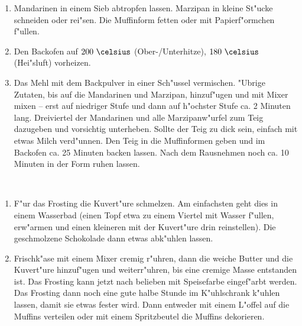 
\begin{enumerate}
 \item Mandarinen in einem Sieb abtropfen lassen. Marzipan in kleine St"ucke schneiden oder rei"sen. Die Muffinform fetten oder mit Papierf"ormchen f"ullen.
 \item Den Backofen auf $200~\celsius$ (Ober-/Unterhitze), $180~\celsius$ (Hei"sluft) vorheizen.
 \item Das Mehl mit dem Backpulver in einer Sch"ussel vermischen. "Ubrige Zutaten, bis auf die Mandarinen und Marzipan, hinzuf"ugen und mit Mixer mixen – erst auf niedriger Stufe und dann auf h"ochster Stufe ca. 2 Minuten lang. Dreiviertel der Mandarinen und alle Marzipanw"urfel zum Teig dazugeben und vorsichtig unterheben. Sollte der Teig zu dick sein, einfach mit etwas Milch verd"unnen. Den Teig in die Muffinformen geben und im Backofen ca. 25 Minuten backen lassen. Nach dem Rausnehmen noch ca. 10 Minuten in der Form ruhen lassen.

\end{enumerate}
\hspace{0em}\\
\begin{enumerate}
 \item F"ur das Frosting die Kuvert"ure schmelzen.
 Am einfachsten geht dies in einem Wasserbad (einen Topf etwa zu einem Viertel mit Wasser f"ullen, erw"armen und einen kleineren mit der Kuvert"ure drin reinstellen). 
 Die geschmolzene Schokolade dann etwas abk"uhlen lassen.
 \item Frischk"ase mit einem Mixer cremig r"uhren, dann die weiche Butter und die Kuvert"ure hinzuf"ugen und weiterr"uhren, bis eine cremige Masse entstanden ist. Das Frosting kann jetzt nach belieben mit Speisefarbe eingef"arbt werden.
Das Frosting dann noch eine gute halbe Stunde im K"uhlschrank k"uhlen lassen, damit sie etwas fester wird. Dann entweder mit einem L"offel auf die Muffins verteilen oder mit einem Spritzbeutel die Muffins dekorieren.
\end{enumerate}

